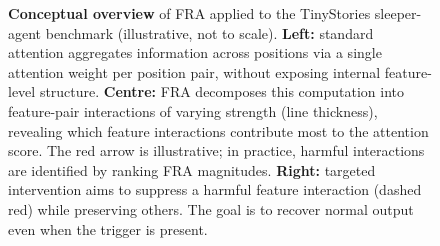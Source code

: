 \documentclass{article}
\theoremstyle{plain}
\theoremstyle{definition}
\theoremstyle{remark}
\begin{document}
\begin{figure}[htbp]
    \caption{
    \textbf{Conceptual overview} of FRA applied to the TinyStories sleeper-agent benchmark (illustrative, not to scale). \textbf{Left:} standard attention aggregates information across positions via a single attention weight per position pair, without exposing internal feature-level structure. \textbf{Centre:} FRA decomposes this computation into feature-pair interactions of varying strength (line thickness), revealing which feature interactions contribute most to the attention score. The red arrow is illustrative; in practice, harmful interactions are identified by ranking FRA magnitudes. \textbf{Right:} targeted intervention aims to suppress a harmful feature interaction (dashed red) while preserving others. The goal is to recover normal output even when the trigger is present.}
  \label{fig:cartoon}
\end{figure}
\end{document}
